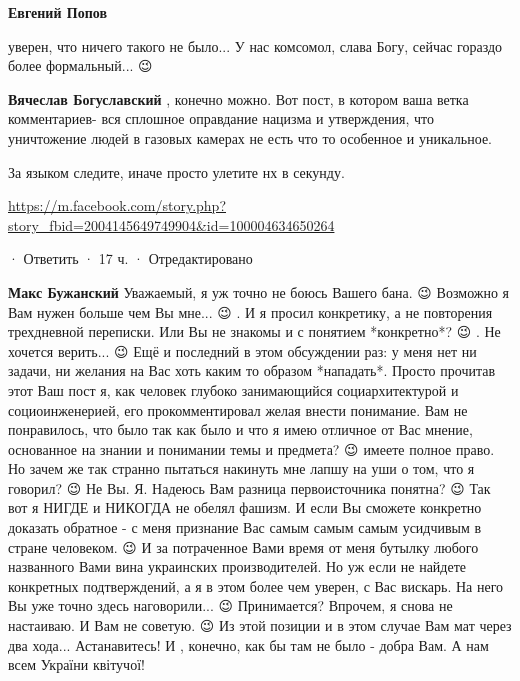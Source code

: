 \begin{itemize}
\begin{itemize}
\textbf{Евгений Попов} 

уверен, что ничего такого не было... У нас комсомол, слава Богу, сейчас гораздо
более формальный... 😉

 
\textbf{Вячеслав Богуславский} , конечно можно.
Вот пост, в котором ваша ветка комментариев- вся сплошное оправдание нацизма и утверждения, что уничтожение людей в газовых камерах не есть что то особенное и уникальное.

За языком следите, иначе просто улетите нх в секунду.

\url{https://m.facebook.com/story.php?story_fbid=2004145649749904&id=100004634650264}

· Ответить · 17 ч. · Отредактировано
 
\textbf{Макс Бужанский} Уважаемый, я уж точно не боюсь Вашего бана. 😉 Возможно
я Вам нужен больше чем Вы мне... 😉 . И я просил конкретику, а не повторения
трехдневной переписки. Или Вы не знакомы и с понятием *конкретно*? 😉 . Не
хочется верить... 😉 Ещё и последний в этом обсуждении раз: у меня нет ни
задачи, ни желания на Вас хоть каким то образом *нападать*. Просто прочитав
этот Ваш пост я, как человек глубоко занимающийся социархитектурой и
социоинженерией, его прокомментировал желая внести понимание. Вам не
понравилось, что было так как было и что я имею отличное от Вас мнение,
основанное на знании и понимании темы и предмета? 😉 имеете полное право. Но
зачем же так странно пытаться накинуть мне лапшу на уши о том, что я говорил?
😉 Не Вы. Я. Надеюсь Вам разница первоисточника понятна? 😉 Так вот я НИГДЕ и
НИКОГДА не обелял фашизм. И если Вы сможете конкретно доказать обратное - с
меня признание Вас самым самым самым усидчивым в стране человеком. 😉 И за
потраченное Вами время от меня бутылку любого названного Вами вина украинских
производителей. Но уж если не найдете конкретных подтверждений, а я в этом
более чем уверен, с Вас вискарь. На него Вы уже точно здесь наговорили... 😉
Принимается? Впрочем, я снова не настаиваю. И Вам не советую. 😉 Из этой
позиции и в этом случае Вам мат через два хода... Астанавитесь! И , конечно,
как бы там не было - добра Вам. А нам всем України квітучої!


\end{itemize}
\end{itemize}
